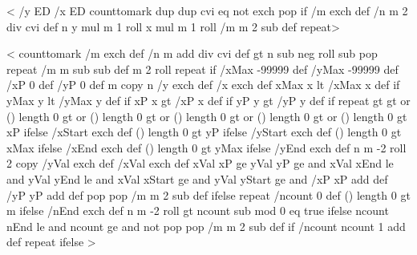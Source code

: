 \def\fileplot{\def\pst@par{}\pst@object{fileplot}}
\def\fileplot@i#1{%
  \pst@killglue
  \begingroup
    \use@par
    \@pstfalse
    \@nameuse{testqp@\psplotstyle}%
    \if@pst
      \dataplot@ii{\pst@readfile{#1}}%
    \else
      \listplot@ii{\pst@altreadfile{#1}}%
    \fi
  \endgroup
  \ignorespaces}
%
\def\pstScalePoints(#1,#2)#3#4{%
  \pst@def{ScalePoints}<%
    /y ED /x ED
    counttomark dup dup cvi eq not { exch pop } if
    /m exch def /n m 2 div cvi def
    n {
      #4\space y mul #2\space mul m 1 roll
      #3\space x mul #1\space mul m 1 roll
      /m m 2 sub
      def } repeat>
}
%
<%
  /y ED /x ED
  counttomark dup dup cvi eq not { exch pop } if
  /m exch def /n m 2 div cvi def
  n { y mul m 1 roll x mul m 1 roll /m m 2 sub def } repeat>

<{%
  counttomark /m exch def
  /n m \psk@plotNoMax{} add div cvi def
  \psk@plotNoMax{} gt {%
    n {
      \psk@plotNoMax\space \psk@plotNo{} sub neg roll %
      \psk@plotNoMax{} sub { pop } repeat %
      /m m \psk@plotNoMax{} sub sub def
      m 2 roll
    } repeat
  } if %
  /xMax -99999 def /yMax -99999 def
  /xP 0 def /yP 0 def
  m copy
  n {
    /y exch def /x exch def
    xMax x lt { /xMax x def } if
    yMax y lt {/yMax y def } if
    xP x gt { /xP x def } if
    yP y gt { /yP y def } if
  } repeat
  \psk@xStep{} gt \psk@yStep{} gt or (\psk@xStart) length 0 gt or
  (\psk@yStart) length 0 gt or (\psk@xEnd) length 0 gt or (\psk@yEnd) length 0 gt or {
%
    (\psk@xStart) length 0 gt {\psk@xStart\space }{ xP } ifelse /xStart exch def
    (\psk@yStart) length 0 gt {\psk@yStart\space }{ yP } ifelse /yStart exch def
    (\psk@xEnd) length 0 gt { \psk@xEnd\space }{ xMax } ifelse /xEnd exch def
    (\psk@yEnd) length 0 gt { \psk@yEnd\space }{ yMax } ifelse /yEnd exch def
    n {
      m -2 roll
      2 copy /yVal exch def /xVal exch def
      xVal xP ge
      yVal yP ge and
      xVal xEnd le and
      yVal yEnd le and
      xVal xStart ge and
      yVal yStart ge and {
        /xP xP \psk@xStep\space add def
        /yP yP \psk@yStep\space add def
      }{%
        pop pop
        /m m 2 sub def
      } ifelse
    } repeat
  }{%
    /ncount 0 def
    (\psk@nEnd) length 0 gt { \psk@nEnd\space }{ m } ifelse 
    /nEnd exch def
    n {
      m -2 roll
      \psk@nStep{} gt {
        ncount \psk@nStart\space sub \psk@nStep\space mod 0 eq }{ true } ifelse
        ncount nEnd le and
        ncount \psk@nStart\space ge and not {
          pop pop
          /m m 2 sub def
        } if
        /ncount ncount 1 add def
      } repeat
  } ifelse
}>
%

